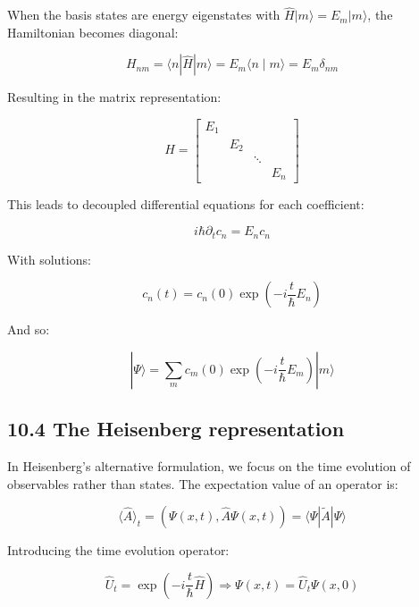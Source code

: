 \documentclass[10pt]{article}
\begin{document}
When the basis states are energy eigenstates with $\hat{H}|m\rangle=E_{m}|m\rangle$, the Hamiltonian becomes diagonal:

\begin{equation*}
H_{n m}=\langle n| \hat{H}|m\rangle=E_{m}\langle n \mid m\rangle=E_{m} \delta_{n m} \tag{10.23}
\end{equation*}

Resulting in the matrix representation:

\[
H=\left[\begin{array}{llll}
E_{1} & & &  \tag{10.24}\\
& E_{2} & & \\
& & \ddots & \\
& & & E_{n}
\end{array}\right]
\]

This leads to decoupled differential equations for each coefficient:

\begin{equation*}
i \hbar \partial_{t} c_{n}=E_{n} c_{n} \tag{10.25}
\end{equation*}

With solutions:

\begin{equation*}
c_{n}(t)=c_{n}(0) \exp \left(-i \frac{t}{\hbar} E_{n}\right) \tag{10.26}
\end{equation*}


And so:

\begin{equation*}
|\Psi\rangle=\sum_{m} c_{m}(0) \exp \left(-i \frac{t}{\hbar} E_{m}\right)|m\rangle \tag{10.27}
\end{equation*}

\subsection*{10.4 The Heisenberg representation}
In Heisenberg's alternative formulation, we focus on the time evolution of observables rather than states. The expectation value of an operator is:

\begin{equation*}
\langle\hat{A}\rangle_{t}=(\Psi(x, t), \hat{A} \Psi(x, t))=\langle\Psi| \tilde{A}|\Psi\rangle \tag{10.28}
\end{equation*}

Introducing the time evolution operator:

\begin{equation*}
\hat{U}_{t}=\exp \left(-i \frac{t}{\hbar} \hat{H}\right) \Longrightarrow \Psi(x, t)=\hat{U}_{t} \Psi(x, 0) \tag{10.29}
\end{equation*}
\end{document}
